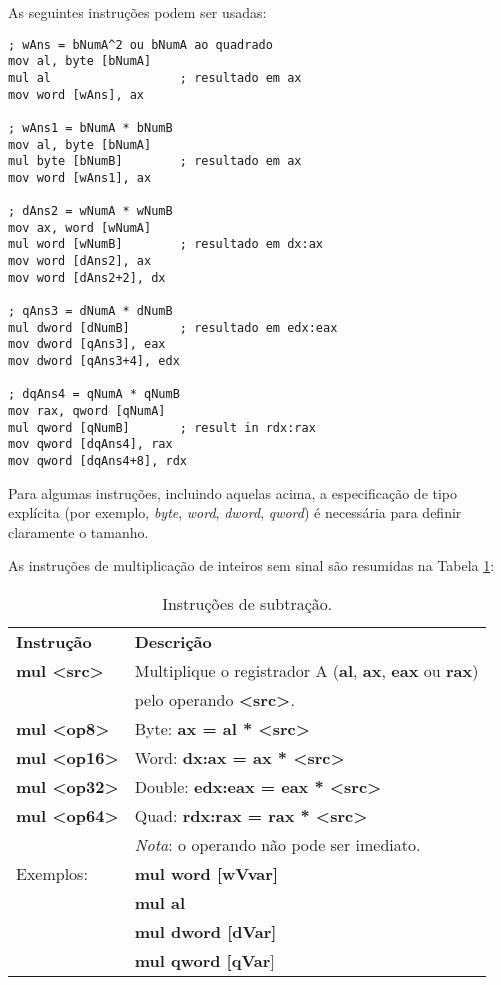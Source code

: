 As seguintes instruções podem ser usadas:
\begin{lstlisting}
; wAns = bNumA^2 ou bNumA ao quadrado
mov al, byte [bNumA]
mul al                  ; resultado em ax
mov word [wAns], ax

; wAns1 = bNumA * bNumB
mov al, byte [bNumA]
mul byte [bNumB]        ; resultado em ax
mov word [wAns1], ax

; dAns2 = wNumA * wNumB
mov ax, word [wNumA]
mul word [wNumB]        ; resultado em dx:ax
mov word [dAns2], ax
mov word [dAns2+2], dx

; qAns3 = dNumA * dNumB
mul dword [dNumB]       ; resultado em edx:eax
mov dword [qAns3], eax
mov dword [qAns3+4], edx

; dqAns4 = qNumA * qNumB
mov rax, qword [qNumA]
mul qword [qNumB]       ; result in rdx:rax
mov qword [dqAns4], rax
mov qword [dqAns4+8], rdx
\end{lstlisting}

Para algumas instruções, incluindo aquelas acima, a especificação de tipo explícita (por exemplo, \textit{byte}, \textit{word}, \textit{dword}, \textit{qword}) é necessária para definir claramente o tamanho.

As instruções de multiplicação de inteiros sem sinal são resumidas na Tabela \ref{tab:multss}:

\begin{table}[ht]
	\begin{center}
		\begin{tabular}{|ll|}
			\hline
			\rowcolor[HTML]{C0C0C0}
			\textbf{Instrução} & \textbf{Descrição} \\ 
			\textbf{mul <src>} & Multiplique o registrador A (\textbf{al}, \textbf{ax}, \textbf{eax} ou \textbf{rax})\\
			& pelo operando \textbf{<src>}.\\
			\textbf{mul <op8>}& Byte: \textbf{ax = al * <src>}\\
			\textbf{mul <op16>}& Word: \textbf{dx:ax = ax * <src>}\\
			\textbf{mul <op32>}& Double: \textbf{edx:eax = eax * <src>}\\
			\textbf{mul <op64>}& Quad: \textbf{rdx:rax = rax * <src>}\\
			& \textit{Nota}: o operando não pode ser imediato.\\
			Exemplos:& \textbf{mul  word [wVvar]}\\
			&\textbf{mul al}\\
			&\textbf{mul dword [dVar]}\\
			&\textbf{mul qword [qVar}]\\\hline			   	
		\end{tabular}%
	\end{center}
	\caption{Instruções de subtração.}
	\label{tab:multss}
\end{table}

